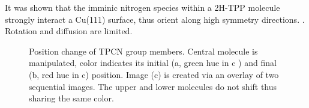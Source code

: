   It was shown that the imminic nitrogen species within a 2H-TPP molecule strongly interact a Cu(111) surface, thus orient along high symmetry directions. .\cite{haq_clean_2011, buchner_diffusion_2011, gonzalez-moreno_following_2011, diller_self-metalation_2012, ditze_activation_2012,rojas_self-assembly_2010} Rotation and diffusion are limited.
  \begin{figure}[!h]
  	\centering
  	\caption{Position change of TPCN group members. Central molecule is manipulated, color indicates its initial (a, green hue in c ) and final (b, red hue in c) position. Image (c) is created via an overlay of two sequential images. The upper and lower molecules do not shift thus sharing the same color.}
  	\label{fig:TPCN-manipulation}
  \end{figure}
  
